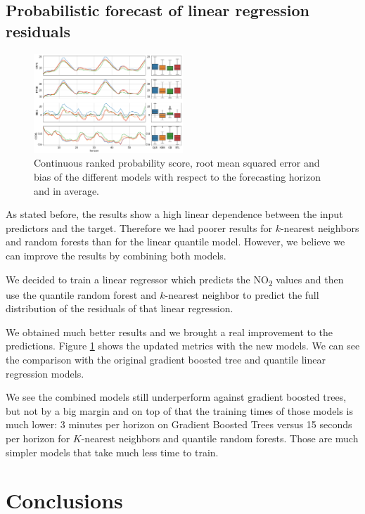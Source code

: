 \documentclass[a4paper,twocolumn,5p]{elsarticle}
\begin{document}
\subsection{Probabilistic forecast of linear regression residuals}

\begin{figure}[tbp]
  \centering
  \includegraphics[width=0.5\textwidth]{results/errorGraph_rfl_knnl}
  \caption{Continuous ranked probability score, root mean squared
    error and bias of the different models with respect to the
    forecasting horizon and in average.}
  \label{figure:errorGraph_rfl}
\end{figure}

As stated before, the results show a high linear dependence between
the input predictors and the target. Therefore we had poorer results
for $k$-nearest neighbors and random forests than for the linear
quantile model. However, we believe we can improve the results by
combining both models.

We decided to train a linear regressor which predicts the
NO\textsubscript{2} values and then use the quantile random forest and
$k$-nearest neighbor to predict the full distribution of the residuals
of that linear regression.

We obtained much better results and we brought a real improvement to
the predictions. Figure \ref{figure:errorGraph_rfl} shows the updated
metrics with the new models.  We can see the comparison with the
original gradient boosted tree and quantile linear regression models.

We see the combined models still underperform against gradient boosted
trees, but not by a big margin and on top of that the training times
of those models is much lower: 3 minutes per horizon on Gradient
Boosted Trees versus 15 seconds per horizon for $K$-nearest neighbors
and quantile random forests. Those are much simpler models that take
much less time to train.

\section{Conclusions}
\label{sec:concl}
\end{document}
